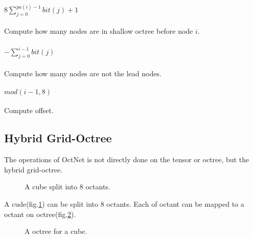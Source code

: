 \documentclass[border=0.5in]{blog}
\newcommand\xaxis{210}
\newcommand\yaxis{-30}
\newcommand\zaxis{90}
\newcommand\topside[3]{
    \fill[fill=yellow, draw=black,shift={(\xaxis:#1)},shift={(\yaxis:#2)},
    shift={(\zaxis:#3)}] (0,0) -- (30:1) -- (0,1) -- (150:1) -- (0,0);
}
\newcommand\leftside[3]{
    \fill[fill=red, draw=black,shift={(\xaxis:#1)},shift={(\yaxis:#2)},
    shift={(\zaxis:#3)}] (0,0) -- (0,-1) -- (210:1) --(150:1)--(0,0);
}
\newcommand\rightside[3]{
    \fill[fill=green, draw=black,shift={(\xaxis:#1)},shift={(\yaxis:#2)},
    shift={(\zaxis:#3)}] (0,0) -- (30:1) -- (-30:1) --(0,-1)--(0,0);
}
\newcommand\cube[3]{
    \topside{#1}{#2}{#3}
    \leftside{#1}{#2}{#3}
    \rightside{#1}{#2}{#3}
}
\begin{document}
    \paragraph{\color{blue}$8 \sum\limits_{j=0}^{pa(i)-1}bit(j)+1$}
    Compute how many nodes are in shallow octree before node $i$.
    
    \paragraph{\color{blue}$-\sum\limits_{j=0}^{i-1}bit(j)$}
    Compute how many nodes are not the lead nodes.
    
    \paragraph{\color{blue}$mod(i-1,8)$}
    Compute offset.
    
    \subsection{Hybrid Grid-Octree}
    \label{sec:octnet:hgo}
    
    The operations of OctNet is not directly done on the tensor or octree,
    but the hybrid grid-octree.
    
    \begin{figure}
        \centering
        \caption{A cube split into 8 octants.}
        \label{fig:octnet:cube-octant}
    \end{figure}

    A cude(fig.\ref{fig:octnet:cube-octant}) can be split into 8 octants.
    Each of octant can be mapped to a octant on octree(fig.\ref{fig:octnet:octree-1}).

    \begin{figure}
        \centering
        \caption{A octree for a cube.}
        \label{fig:octnet:octree-1}
    \end{figure}
    
\end{document}
